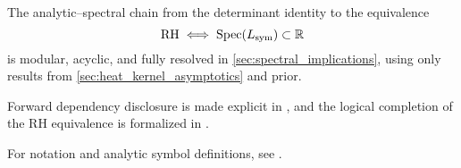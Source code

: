 The analytic–spectral chain from the determinant identity to the equivalence
\[
\mathrm{RH} \iff \operatorname{Spec}(L_{\mathrm{sym}}) \subset \mathbb{R}
\]
is modular, acyclic, and fully resolved in \cref{sec:spectral_implications}, using only results from \cref{sec:heat_kernel_asymptotics} and prior.

Forward dependency disclosure is made explicit in , and the logical completion of the RH equivalence is formalized in .

For notation and analytic symbol definitions, see .
